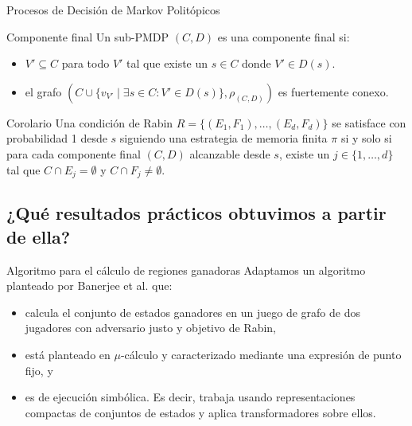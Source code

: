 \documentclass{beamer}
\begin{document}
\begin{frame}{Procesos de Decisi\'on de Markov Polit\'opicos}
	\begin{block}{Componente final}
		Un sub-PMDP $(C, D)$ es una componente final si:

		\begin{itemize}
			\item $V' \subseteq C$ para todo $V'$ tal que existe un $s \in C$ donde $V' \in D(s)$.

			\item el grafo $(C \cup \{v_{V'} \mid \exists s \in C : V' \in D(s)\}, \rho_{(C,D)})$
			      es fuertemente conexo.
		\end{itemize}
	\end{block}

	\pause
	\begin{block}{Corolario}
		Una condición de Rabin $R = \{ (E_1, F_1), \dots, (E_d, F_d)\}$ se satisface con probabilidad 1 desde $s$ siguiendo una estrategia de memoria finita $\pi$ si y solo si para cada componente final $(C,D)$ alcanzable desde $s$, existe un $j \in \{ 1, \dots, d\}$ tal que $C \cap E_j = \emptyset$ y $C \cap F_j \neq \emptyset$.
	\end{block}
\end{frame}

\subsection{¿Qu\'e resultados pr\'acticos obtuvimos a partir de ella?}

\begin{frame}{Algoritmo para el c\'alculo de regiones ganadoras}
	\pause
	Adaptamos un algoritmo planteado por Banerjee et al. que:
	\pause
	\begin{itemize}
		\item calcula el conjunto de estados ganadores en un juego de grafo de dos jugadores
		      con adversario justo y objetivo de Rabin, \pause
		\item está planteado en $\mu$-c\'alculo y caracterizado mediante una expresión de
		      punto fijo, y \pause
		\item es de ejecuci\'on simb\'olica. Es decir, trabaja usando representaciones
		      compactas de conjuntos de estados y aplica transformadores sobre ellos.
	\end{itemize}
\end{frame}
\end{document}
